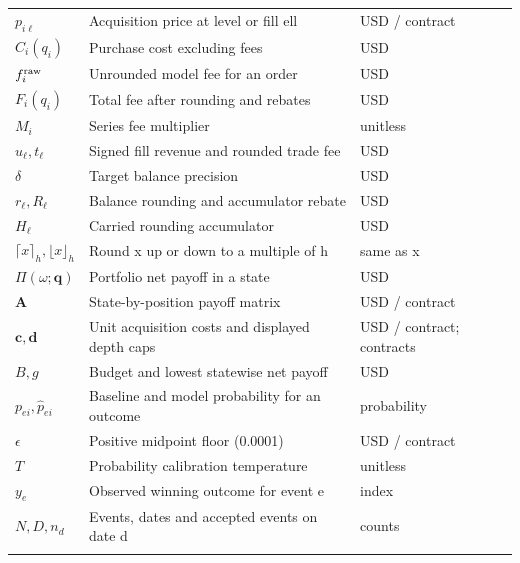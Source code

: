 {\begin{longtable}{@{}L{30mm}L{96mm}L{32mm}@{}}
$p_{i\ell}$ & Acquisition price at level or fill ell & USD / contract \\ \hline
$C_i(q_i)$ & Purchase cost excluding fees & USD \\ \hline
$f_i^{\rm raw}$ & Unrounded model fee for an order & USD \\ \hline
$F_i(q_i)$ & Total fee after rounding and rebates & USD \\ \hline
$M_i$ & Series fee multiplier & unitless \\ \hline
$u_\ell,t_\ell$ & Signed fill revenue and rounded trade fee & USD \\ \hline
$\delta$ & Target balance precision & USD \\ \hline
$r_\ell,R_\ell$ & Balance rounding and accumulator rebate & USD \\ \hline
$H_\ell$ & Carried rounding accumulator & USD \\ \hline
$\lceil x\rceil_h,\lfloor x\rfloor_h$ & Round x up or down to a multiple of h & same as x \\ \hline
$\Pi(\omega;\mathbf q)$ & Portfolio net payoff in a state & USD \\ \hline
$\mathbf A$ & State-by-position payoff matrix & USD / contract \\ \hline
$\mathbf c,\mathbf d$ & Unit acquisition costs and displayed depth caps & USD / contract; contracts \\ \hline
$B,g$ & Budget and lowest statewise net payoff & USD \\ \hline
$p_{ei},\widehat p_{ei}$ & Baseline and model probability for an outcome & probability \\ \hline
$\epsilon$ & Positive midpoint floor (0.0001) & USD / contract \\ \hline
$T$ & Probability calibration temperature & unitless \\ \hline
$y_e$ & Observed winning outcome for event e & index \\ \hline
$N,D,n_d$ & Events, dates and accepted events on date d & counts \\ \hline

\end{longtable}}
